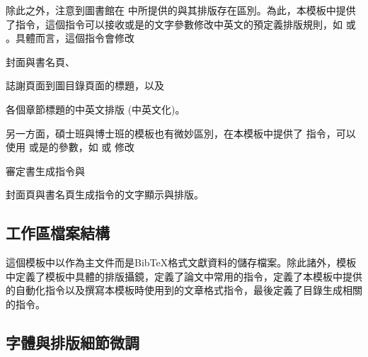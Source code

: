 \documentclass[12pt]{report}
\theoremstyle{plain}
\begin{document}
除此之外，注意到圖書館在 \cite{ntutlibdown} 中所提供的與其排版存在區別。為此，本模板中提供了指令，這個指令可以接收或是的文字參數修改中英文的預定義排版規則，如 或 。具體而言，這個指令會修改
\begin{enumerate*}
    \item 封面與書名頁、
    \item 誌謝頁面到圖目錄頁面的標題，以及
    \item 各個章節標題的中英文排版 (中英文化)。
\end{enumerate*}
另一方面，碩士班與博士班的模板也有微妙區別，在本模板中提供了  指令，可以使用  或是的參數，如 或 修改
\begin{enumerate*}
    \item 審定書生成指令與
    \item 封面頁與書名頁生成指令的文字顯示與排版。
\end{enumerate*}

\subsection{工作區檔案結構}

這個模板中以作為主文件而是BibTeX格式文獻資料的儲存檔案。除此諸外，模板中定義了模板中具體的排版攝鏡，定義了論文中常用的指令，定義了本模板中提供的自動化指令以及撰寫本模板時使用到的文章格式指令，最後定義了目錄生成相關的指令。

\subsection{字體與排版細節微調}
\end{document}
